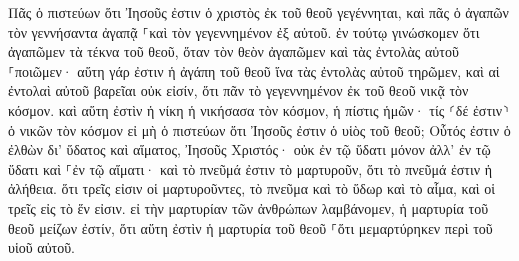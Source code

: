 \documentclass{openreader}
\begin{document}
Πᾶς ὁ πιστεύων ὅτι Ἰησοῦς ἐστιν ὁ χριστὸς ἐκ τοῦ θεοῦ γεγέννηται, καὶ πᾶς ὁ ἀγαπῶν τὸν γεννήσαντα ἀγαπᾷ ⸀καὶ τὸν γεγεννημένον ἐξ αὐτοῦ. 
ἐν τούτῳ γινώσκομεν ὅτι ἀγαπῶμεν τὰ τέκνα τοῦ θεοῦ, ὅταν τὸν θεὸν ἀγαπῶμεν καὶ τὰς ἐντολὰς αὐτοῦ ⸀ποιῶμεν· 
αὕτη γάρ ἐστιν ἡ ἀγάπη τοῦ θεοῦ ἵνα τὰς ἐντολὰς αὐτοῦ τηρῶμεν, καὶ αἱ ἐντολαὶ αὐτοῦ βαρεῖαι οὐκ εἰσίν, 
ὅτι πᾶν τὸ γεγεννημένον ἐκ τοῦ θεοῦ νικᾷ τὸν κόσμον. καὶ αὕτη ἐστὶν ἡ νίκη ἡ νικήσασα τὸν κόσμον, ἡ πίστις ἡμῶν· 
τίς ⸂δέ ἐστιν⸃ ὁ νικῶν τὸν κόσμον εἰ μὴ ὁ πιστεύων ὅτι Ἰησοῦς ἐστιν ὁ υἱὸς τοῦ θεοῦ; 
Οὗτός ἐστιν ὁ ἐλθὼν δι’ ὕδατος καὶ αἵματος, Ἰησοῦς Χριστός· οὐκ ἐν τῷ ὕδατι μόνον ἀλλ’ ἐν τῷ ὕδατι καὶ ⸀ἐν τῷ αἵματι· καὶ τὸ πνεῦμά ἐστιν τὸ μαρτυροῦν, ὅτι τὸ πνεῦμά ἐστιν ἡ ἀλήθεια. 
ὅτι τρεῖς εἰσιν οἱ μαρτυροῦντες, 
τὸ πνεῦμα καὶ τὸ ὕδωρ καὶ τὸ αἷμα, καὶ οἱ τρεῖς εἰς τὸ ἕν εἰσιν. 
εἰ τὴν μαρτυρίαν τῶν ἀνθρώπων λαμβάνομεν, ἡ μαρτυρία τοῦ θεοῦ μείζων ἐστίν, ὅτι αὕτη ἐστὶν ἡ μαρτυρία τοῦ θεοῦ ⸀ὅτι μεμαρτύρηκεν περὶ τοῦ υἱοῦ αὐτοῦ. 
\end{document}
